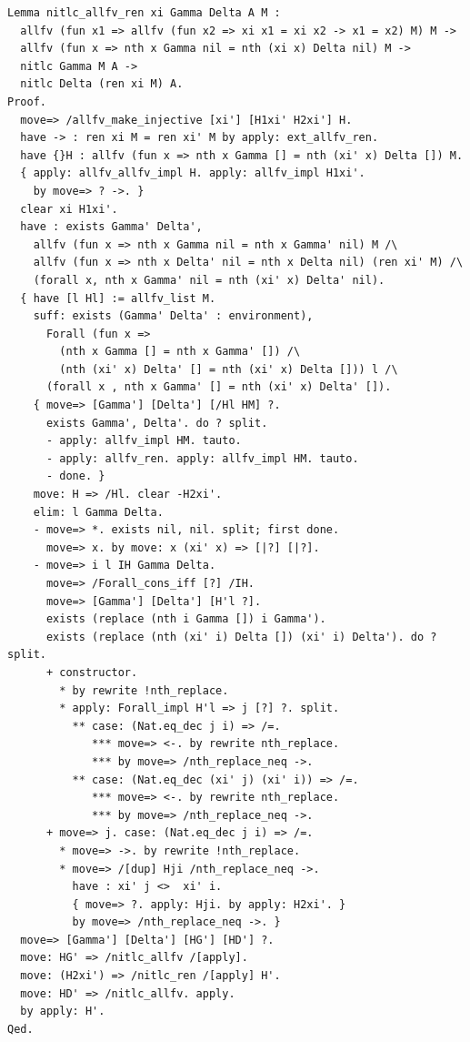 \begin{lstlisting}[style=authorcoq]
Lemma nitlc_allfv_ren xi Gamma Delta A M :
  allfv (fun x1 => allfv (fun x2 => xi x1 = xi x2 -> x1 = x2) M) M ->
  allfv (fun x => nth x Gamma nil = nth (xi x) Delta nil) M ->
  nitlc Gamma M A ->
  nitlc Delta (ren xi M) A.
Proof.
  move=> /allfv_make_injective [xi'] [H1xi' H2xi'] H.
  have -> : ren xi M = ren xi' M by apply: ext_allfv_ren.
  have {}H : allfv (fun x => nth x Gamma [] = nth (xi' x) Delta []) M.
  { apply: allfv_allfv_impl H. apply: allfv_impl H1xi'.
    by move=> ? ->. }
  clear xi H1xi'.
  have : exists Gamma' Delta',
    allfv (fun x => nth x Gamma nil = nth x Gamma' nil) M /\
    allfv (fun x => nth x Delta' nil = nth x Delta nil) (ren xi' M) /\
    (forall x, nth x Gamma' nil = nth (xi' x) Delta' nil).
  { have [l Hl] := allfv_list M.
    suff: exists (Gamma' Delta' : environment),
      Forall (fun x => 
        (nth x Gamma [] = nth x Gamma' []) /\
        (nth (xi' x) Delta' [] = nth (xi' x) Delta [])) l /\
      (forall x , nth x Gamma' [] = nth (xi' x) Delta' []).
    { move=> [Gamma'] [Delta'] [/Hl HM] ?.
      exists Gamma', Delta'. do ? split.
      - apply: allfv_impl HM. tauto.
      - apply: allfv_ren. apply: allfv_impl HM. tauto.
      - done. }
    move: H => /Hl. clear -H2xi'.
    elim: l Gamma Delta.
    - move=> *. exists nil, nil. split; first done.
      move=> x. by move: x (xi' x) => [|?] [|?].
    - move=> i l IH Gamma Delta.
      move=> /Forall_cons_iff [?] /IH.
      move=> [Gamma'] [Delta'] [H'l ?].
      exists (replace (nth i Gamma []) i Gamma').
      exists (replace (nth (xi' i) Delta []) (xi' i) Delta'). do ? split.
      + constructor.
        * by rewrite !nth_replace.
        * apply: Forall_impl H'l => j [?] ?. split.
          ** case: (Nat.eq_dec j i) => /=.
             *** move=> <-. by rewrite nth_replace.
             *** by move=> /nth_replace_neq ->.
          ** case: (Nat.eq_dec (xi' j) (xi' i)) => /=.
             *** move=> <-. by rewrite nth_replace.
             *** by move=> /nth_replace_neq ->.
      + move=> j. case: (Nat.eq_dec j i) => /=.
        * move=> ->. by rewrite !nth_replace.
        * move=> /[dup] Hji /nth_replace_neq ->.
          have : xi' j <>  xi' i.
          { move=> ?. apply: Hji. by apply: H2xi'. }
          by move=> /nth_replace_neq ->. }
  move=> [Gamma'] [Delta'] [HG'] [HD'] ?.
  move: HG' => /nitlc_allfv /[apply].
  move: (H2xi') => /nitlc_ren /[apply] H'.
  move: HD' => /nitlc_allfv. apply.
  by apply: H'.
Qed.
\end{lstlisting}
\clearpage
